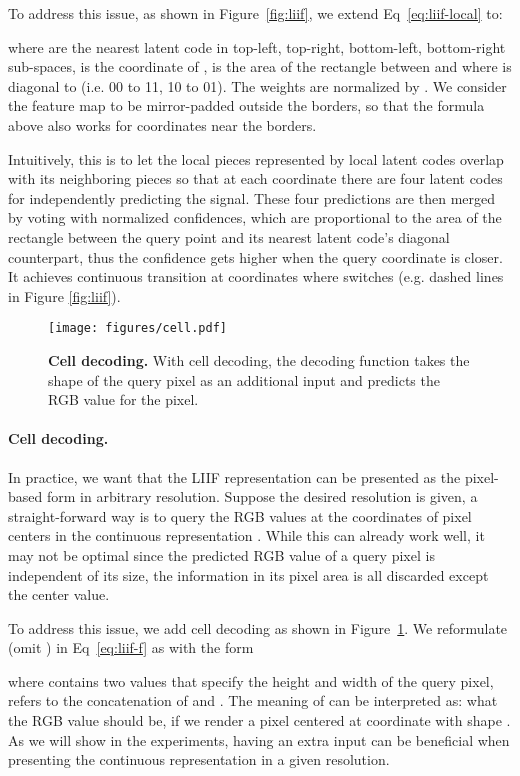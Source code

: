 \documentclass[final]{cvpr}
\begin{document}
To address this issue, as shown in Figure~\ref{fig:liif}, we extend Eq~\ref{eq:liif-local} to:

where  are the nearest latent code in top-left, top-right, bottom-left, bottom-right sub-spaces,  is the coordinate of ,  is the area of the rectangle between  and  where  is diagonal to  (i.e. 00 to 11, 10 to 01). The weights are normalized by . We consider the feature map  to be mirror-padded outside the borders, so that the formula above also works for coordinates near the borders.

Intuitively, this is to let the local pieces represented by local latent codes overlap with its neighboring pieces so that at each coordinate there are four latent codes for independently predicting the signal. These four predictions are then merged by voting with normalized confidences, which are proportional to the area of the rectangle between the query point and its nearest latent code's diagonal counterpart, thus the confidence gets higher when the query coordinate is closer. It achieves continuous transition at coordinates where  switches (e.g. dashed lines in Figure \ref{fig:liif}).

\begin{figure}
    \centering
    \texttt{[image: figures/cell.pdf]}
    \caption{\textbf{Cell decoding.} With cell decoding, the decoding function takes the shape of the query pixel as an additional input and predicts the RGB value for the pixel.}
    \label{fig:cell}
\end{figure}

\vspace{-1em}
\paragraph{Cell decoding.} In practice, we want that the LIIF representation can be presented as the pixel-based form in arbitrary resolution. Suppose the desired resolution is given, a straight-forward way is to query the RGB values at the coordinates of pixel centers in the continuous representation . While this can already work well, it may not be optimal since the predicted RGB value of a query pixel is independent of its size, the information in its pixel area is all discarded except the center value.

To address this issue, we add cell decoding as shown in Figure~\ref{fig:cell}. We reformulate  (omit ) in Eq~\ref{eq:liif-f} as  with the form

where  contains two values that specify the height and width of the query pixel,  refers to the concatenation of  and . The meaning of  can be interpreted as: what the RGB value should be, if we render a pixel centered at coordinate  with shape . As we will show in the experiments, having an extra input  can be beneficial when presenting the continuous representation in a given resolution.
\end{document}
